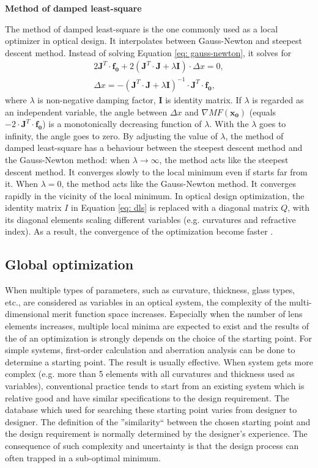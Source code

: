 \textbf{Method of damped least-square}

The method of damped least-square is the one commonly used as a local optimizer in optical design. It interpolates between Gauss-Newton and steepest descent method.  
Instead of solving Equation \ref{eq: gauss-newton}, it solves for 
\begin{equation} \label{eq: dls}
\begin{split}
2 \pmb{J}^{T} \cdot \pmb{f_0} + 2(\pmb{J}^T \cdot \pmb{J} + \lambda \pmb{I} )\cdot \Delta x = 0 , \\
\Delta x = - (\pmb{J}^T \cdot \pmb{J} + \lambda \pmb{I} )^{-1} \cdot \pmb{J}^{T} \cdot \pmb{f_0},
\end{split}
\end{equation}where $\lambda$ is non-negative damping factor, $\pmb{I}$ is identity matrix. If $\lambda$ is regarded as an independent variable, the angle between $\Delta x$ and $\nabla MF(\pmb{x_0}) $ (equals $-2 \cdot \pmb{J}^{T} \cdot \pmb{f_0}$) is a monotonically decreasing function of $\lambda$. With the $\lambda$ goes to infinity, the angle goes to zero. By adjusting the value of $\lambda$, the method of damped least-square has a behaviour between the steepest descent method and the Gauss-Newton method: when $\lambda \rightarrow \infty $, the method acts like the steepest descent method. It converges slowly to the local minimum even if starts far from it. When $\lambda = 0$, the method acts like the Gauss-Newton method. It converges rapidly in the vicinity of the local minimum. 
In optical design optimization, the identity matrix $I$ in Equation \ref{eq: dls} is replaced with a diagonal matrix $Q$, with its diagonal elements scaling different variables (e.g. curvatures and refractive index). As a result, the convergence of the optimization become faster \cite{Meiron:65_dls}.

\subsection{Global optimization}
\vspace{1em}
When multiple types of parameters, such as curvature, thickness, glass types, etc., are considered as variables in an optical system, the complexity of the multi-dimensional merit function space increases. Especially when the number of lens elements increases, multiple local minima are expected to exist and the results of the of an optimization is strongly depends on the choice of the starting point. For simple systems, first-order calculation and aberration analysis can be done to determine a starting point. The result is usually effective. When system gets more complex (e.g. more than 5 elements with all curvatures and thickness used as variables), conventional practice tends to start from an existing system which is relative good and have similar specifications to the design requirement. The database which used for searching these starting point varies from designer to designer. The definition of the ”similarity“ between the chosen starting point and the design requirement is normally determined by the designer's experience. The consequence of such complexity and uncertainty is that the design process can often trapped in a sub-optimal minimum. 

